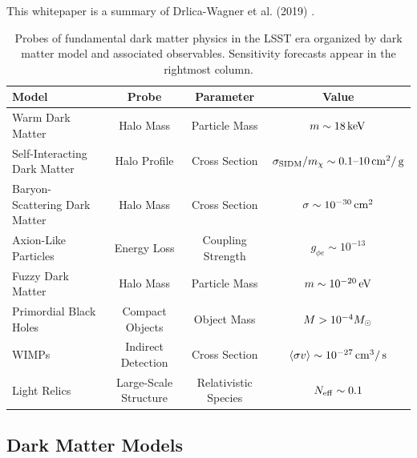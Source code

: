 \documentclass[12pt]{article}
\begin{document}
This whitepaper is a summary of Drlica-Wagner et al. (2019) \citep{drlica-wagner_2019_lsst_dark_matter}.

\begin{table}[ht]
\footnotesize
\begin{center}
\begin{tabular}{l c c c}
\hline 
Model & Probe & Parameter & Value \\
\hline 
\hline
Warm Dark Matter  & Halo Mass & Particle Mass & $m \sim 18 \mathrm{\,keV}$ \\
Self-Interacting Dark Matter & Halo Profile & Cross Section & $\sigma_{\rm SIDM}/m_\chi \sim 0.1\text{--}10\mathrm{\,cm}^2/\mathrm{\,g}$ \\
Baryon-Scattering Dark Matter & Halo Mass & Cross Section & $\sigma \sim 10^{-30} \mathrm{\,cm}^2$ \\
Axion-Like Particles & Energy Loss & Coupling Strength & $g_{\phi e} \sim 10^{-13} $ \\
Fuzzy Dark Matter & Halo Mass & Particle Mass & $m \sim 10^{-20} \mathrm{\,eV}$  \\
Primordial Black Holes  & Compact Objects & Object Mass & $M > 10^{-4} M_\odot$ \\
WIMPs & Indirect Detection & Cross Section & $\langle \sigma v \rangle \sim 10^{-27} \mathrm{\,cm}^3/\mathrm{\,s}$ \\
Light Relics & Large-Scale Structure & Relativistic Species & $N_{\rm eff} \sim 0.1$ \\[+0.5em]
\hline
\end{tabular}
\end{center}
\vspace{-1em}
\caption{\label{tab:models} Probes of fundamental dark matter physics in the LSST era organized by dark matter model and associated observables. Sensitivity forecasts appear in the rightmost column.}


\end{table}

\vspace{-1em} \subsection*{Dark Matter Models} \vspace{-0.5em}
\end{document}
